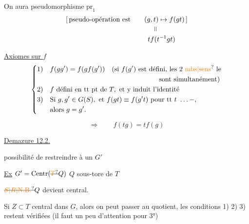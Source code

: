 On aura pseudomorphisme $\mathrm{pr}_1$
\[
\begin{aligned}
&[\,\text{pseudo-opération est}\qquad (g,t)\mapsto f(gt)\,]\\
&\hspace{13em}\rotatebox{90}{$=$}\\[-2pt]
&\hspace{12em}t f(t^{-1}gt)
\end{aligned}
\]

\uline{Axiomes sur $f$}
\[
\left\{\begin{aligned}
1)\quad &f(gg')=f(gf(g'))\quad \text{(si }f(g')\text{ est défini, les 2 \unsure{mbs|sens} le}\\
&\hspace{16em}\text{sont simultanément)}\\
2)\quad &f\ \text{défini en tt pt de }T,\ \text{et y induit l'identité}\\
3)\quad &\text{Si }g,g'\in G(S),\ \text{et }f(gt)\equiv f(g't)\ \text{pour tt }t\ \ldots-,\\
&\text{alors }g=g'.
\end{aligned}\right.
\]

\[
\Longrightarrow \qquad f(tg)=tf(g)
\]

\uline{Demazure 12.2.}

possibilité de restreindre à un $G'$

\uline{Ex} \quad $G'=\mathrm{Centr}(\deleted{\unsure{T}}Q)$ \qquad $Q$ sous-tore de $T$

$\deleted{\unsure{S|R|\mathrm{N.B.}}}Q$ devient central.

Si $Z\subset T$ central dans $G$, alors on peut passer au quotient, les conditions 1) 2) 3) restent vérifiées (il faut un peu d'attention pour 3°)

